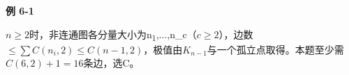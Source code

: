 {\color{ink}\bfseries 例 6-1}\par\vspace{1bp}\(n\ge 2\)时，非连通图各分量大小为n\textsubscript{1},\allowbreak{}\(\ldots \),\allowbreak{}n\_c（\(c\ge 2\)），边数\(\le \sum C(n_{i},\allowbreak{}2)\le C(n-1,\allowbreak{}2)\)，极值由\(K_{n-1}\)与一个孤立点取得。本题至少需\(C(6,\allowbreak{}2)+\allowbreak{}1=\allowbreak{}16\)条边，选C。
